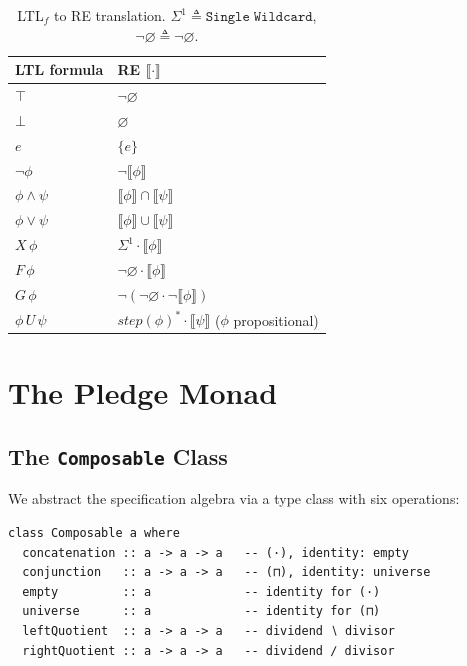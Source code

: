 \documentclass[acmsmall,screen]{acmart}
\newcommand{\sem}[1]{\llbracket #1 \rrbracket}
\newcommand{\univ}{\neg\varnothing}
\begin{document}
\begin{table}[ht]
\caption{LTL$_f$ to RE translation.
         $\Sigma^1 \triangleq \mathtt{Single\;Wildcard}$,
         $\univ \triangleq \neg\varnothing$.}
\label{tab:ltl}
\begin{tabular}{ll}
\toprule
LTL formula & RE $\sem{\cdot}$ \\
\midrule
$\top$              & $\univ$ \\
$\bot$              & $\varnothing$ \\
$e$                 & $\{e\}$ \\
$\neg\phi$          & $\neg\sem{\phi}$ \\
$\phi \wedge \psi$  & $\sem{\phi} \cap \sem{\psi}$ \\
$\phi \vee \psi$    & $\sem{\phi} \cup \sem{\psi}$ \\
$X\,\phi$           & $\Sigma^1 \cdot \sem{\phi}$ \\
$F\,\phi$           & $\univ \cdot \sem{\phi}$ \\
$G\,\phi$           & $\neg(\univ \cdot \neg\sem{\phi})$ \\
$\phi\,U\,\psi$     & $\mathit{step}(\phi)^* \cdot \sem{\psi}$
                      \quad ($\phi$ propositional) \\
\bottomrule
\end{tabular}
\end{table}

\section{The Pledge Monad}
\label{sec:pledge}

\subsection{The \texttt{Composable} Class}
\label{sec:composable}

We abstract the specification algebra via a type class with six operations:

\begin{lstlisting}
class Composable a where
  concatenation :: a -> a -> a   -- (·), identity: empty
  conjunction   :: a -> a -> a   -- (⊓), identity: universe
  empty         :: a             -- identity for (·)
  universe      :: a             -- identity for (⊓)
  leftQuotient  :: a -> a -> a   -- dividend ∖ divisor
  rightQuotient :: a -> a -> a   -- dividend ∕ divisor
\end{lstlisting}
\end{document}
